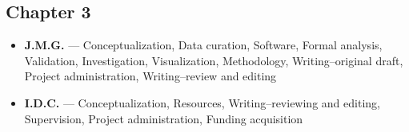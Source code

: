 \documentclass[11pt,a4paper,twoside]{book}
\begin{document}
\begin{doublespace}
\section*{Chapter 3}
\begin{itemize}
\item \textbf{J.M.G.} --- Conceptualization, Data curation, Software, Formal analysis, Validation, Investigation, Visualization, Methodology, Writing--original draft, Project administration, Writing--review and editing
\item \textbf{I.D.C.} --- Conceptualization, Resources, Writing--reviewing and editing, Supervision, Project administration, Funding acquisition
\end{itemize}
\end{doublespace}
\end{document}
